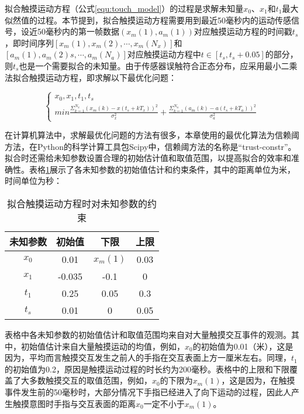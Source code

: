 拟合触摸运动方程（公式\ref{equ:touch_model}）的过程是求解未知量$x_0$、$x_1$和$t_1$最大似然值的过程。本节提到，拟合触摸运动方程需要用到最近50毫秒内的运动传感信号，设近50毫秒内的第一帧数据$(x_m(1),a_m(1))$对应触摸运动方程的时间戳$t_s$，即时间序列$[x_m(1), x_m(2), \cdots, x_m(N_x)]$和$[a_m(1), a_m(2)s, \cdots, a_m(N_a)]$对应触摸运动方程中$t\in [t_s,t_s+0.05]$的部分，则$t_s$也是一个需要拟合的未知量。由于传感器误触符合正态分布，应采用最小二乘法拟合触摸运动方程，即求解以下最优化问题：

\begin{equation}
\begin{cases}
x_0, x_1, t_1, t_s \\
min \frac{\Sigma^{N_x}_{k=1}{\left(x_m(k)-x(t_s+k T_x)\right)^2}}{\sigma_x^2}
+ \frac{\Sigma^{N_a}_{k=1}{\left(a_m(k)-a(t_s+k T_a)\right)^2}}{\sigma_a^2}
\end{cases}
\label{equ:touch_model_calc}
\end{equation}

在计算机算法中，求解最优化问题的方法有很多\cite{bertsekas1997nonlinear, vzilinskas2006practical, bertsimas1993simulated}，本章使用的最优化算法为信赖阈方法\cite{conn2000trust}，在Python的科学计算工具包Scipy中，信赖阈方法的名称是“trust-constr”。拟合时还需给未知参数设置合理的初始估计值和取值范围，以提高拟合的效率和准确性。表格\ref{tab:model_parameter_limit}展示了各未知参数的初始值估计和约束条件，其中的距离单位为米，时间单位为秒：

\begin{table}
	\centering
	\caption{拟合触摸运动方程时对未知参数的约束}
	\begin{tabular}{cccc}
		\toprule
		未知参数 & 初始值 & 下限  & 上限 \\
		\midrule
	    $x_0$ & 0.01 & $x_m(1)$ & 0.03 \\
		$x_1$ & -0.035 & -0.1 & 0 \\
		$t_1$ & 0.25 & 0.05 & 0.3 \\
		$t_s$ & 0.01 & 0 & 0.05 \\
		\bottomrule
	\end{tabular}
	\label{tab:model_parameter_limit}
\end{table}

表格中各未知参数的初始值估计和取值范围均来自对大量触摸交互事件的观测。其中，初始值估计来自大量触摸运动的均值，例如，$x_0$的初始值为0.01（米），这是因为，平均而言触摸交互发生之前人的手指在交互表面上方一厘米左右。同理，$t_1$的初始值为0.2，原因是触摸运动过程的时长约为200毫秒。表格中的上限和下限覆盖了大多数触摸交互的取值范围，例如，$x_0$的下限为$x_m(1)$，这是因为，在触摸事件发生前的50毫秒时，大部分情况下手指已经进入了向下运动的过程，因此人产生触摸意图时手指与交互表面的距离$x_0$一定不小于$x_m(1)$。


